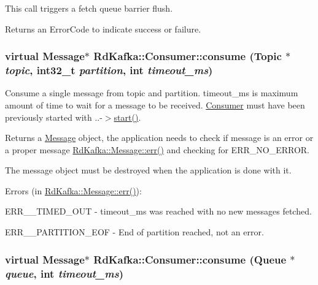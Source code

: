 This call triggers a fetch queue barrier flush.

\begin{DoxyReturn}{Returns}
an ErrorCode to indicate success or failure. 
\end{DoxyReturn}
\hypertarget{classRdKafka_1_1Consumer_a0afd32e342283fc10fa6f32cc25950b7}{
\subsubsection[{consume}]{\setlength{\rightskip}{0pt plus 5cm}virtual {\bf Message}$\ast$ RdKafka::Consumer::consume ({\bf Topic} $\ast$ {\em topic}, \/  int32\_\-t {\em partition}, \/  int {\em timeout\_\-ms})}}
\label{classRdKafka_1_1Consumer_a0afd32e342283fc10fa6f32cc25950b7}


Consume a single message from {\ttfamily topic} and {\ttfamily partition}. {\ttfamily timeout\_\-ms} is maximum amount of time to wait for a message to be received. \hyperlink{classRdKafka_1_1Consumer}{Consumer} must have been previously started with {\ttfamily }..-\/$>$\hyperlink{classRdKafka_1_1Consumer_ad2044e3433f626baff667e1a429d6f33}{start()}.

\begin{DoxyReturn}{Returns}
a \hyperlink{classRdKafka_1_1Message}{Message} object, the application needs to check if message is an error or a proper message \hyperlink{classRdKafka_1_1Message_a90df1fd2a73a74220c9581e6bedb42f2}{RdKafka::Message::err()} and checking for {\ttfamily ERR\_\-NO\_\-ERROR}.
\end{DoxyReturn}
The message object must be destroyed when the application is done with it.

Errors (in \hyperlink{classRdKafka_1_1Message_a90df1fd2a73a74220c9581e6bedb42f2}{RdKafka::Message::err()}):
\begin{DoxyItemize}
\item ERR\_\-\_\-TIMED\_\-OUT -\/ {\ttfamily timeout\_\-ms} was reached with no new messages fetched.
\item ERR\_\-\_\-PARTITION\_\-EOF -\/ End of partition reached, not an error. 
\end{DoxyItemize}\hypertarget{classRdKafka_1_1Consumer_a2393e5cc720f1e08231037af9e4b6ac5}{
\subsubsection[{consume}]{\setlength{\rightskip}{0pt plus 5cm}virtual {\bf Message}$\ast$ RdKafka::Consumer::consume ({\bf Queue} $\ast$ {\em queue}, \/  int {\em timeout\_\-ms})}}
\label{classRdKafka_1_1Consumer_a2393e5cc720f1e08231037af9e4b6ac5}


